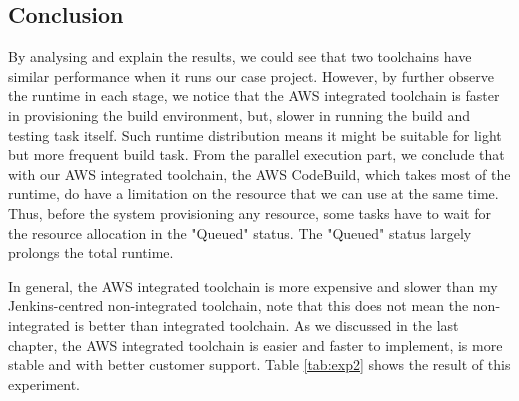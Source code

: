 \subsection{Conclusion}
By analysing and explain the results, we could see that two toolchains have similar performance when it runs our case project. However, by further observe the runtime in each stage, we notice that the AWS integrated toolchain is faster in provisioning the build environment, but, slower in running the build and testing task itself. Such runtime distribution means it might be suitable for light but more frequent build task. From the parallel execution part, we conclude that with our AWS integrated toolchain, the AWS CodeBuild, which takes most of the runtime, do have a limitation on the resource that we can use at the same time. Thus, before the system provisioning any resource, some tasks have to wait for the resource allocation in the "Queued" status. The "Queued" status largely prolongs the total runtime. 
\par
In general, the AWS integrated toolchain is more expensive and slower than my Jenkins-centred non-integrated toolchain, note that this does not mean the non-integrated is better than integrated toolchain. As we discussed in the last chapter, the AWS integrated toolchain is easier and faster to implement, is more stable and with better customer support. Table \ref{tab:exp2} shows the result of this experiment.
